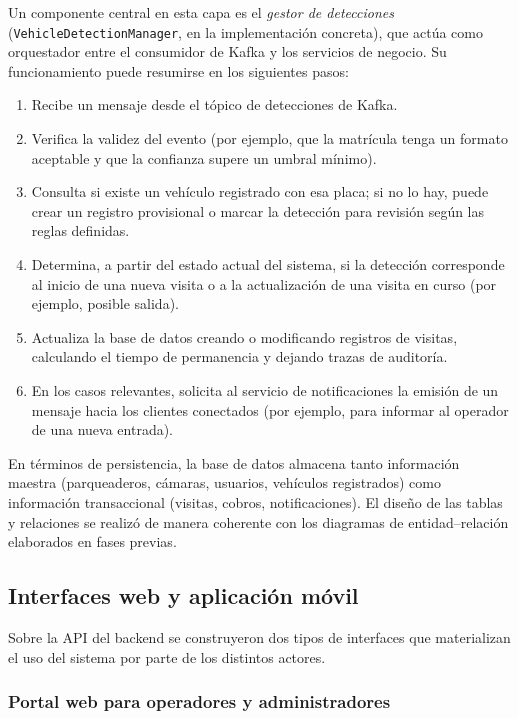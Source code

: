 Un componente central en esta capa es el \textit{gestor de detecciones} (\texttt{VehicleDetectionManager}, en la implementación concreta), que actúa como orquestador entre el consumidor de Kafka y los servicios de negocio. Su funcionamiento puede resumirse en los siguientes pasos:

\begin{enumerate}
    \item Recibe un mensaje desde el tópico de detecciones de Kafka.
    \item Verifica la validez del evento (por ejemplo, que la matrícula tenga un formato aceptable y que la confianza supere un umbral mínimo).
    \item Consulta si existe un vehículo registrado con esa placa; si no lo hay, puede crear un registro provisional o marcar la detección para revisión según las reglas definidas.
    \item Determina, a partir del estado actual del sistema, si la detección corresponde al inicio de una nueva visita o a la actualización de una visita en curso (por ejemplo, posible salida).
    \item Actualiza la base de datos creando o modificando registros de visitas, calculando el tiempo de permanencia y dejando trazas de auditoría.
    \item En los casos relevantes, solicita al servicio de notificaciones la emisión de un mensaje hacia los clientes conectados (por ejemplo, para informar al operador de una nueva entrada).
\end{enumerate}

En términos de persistencia, la base de datos almacena tanto información maestra (parqueaderos, cámaras, usuarios, vehículos registrados) como información transaccional (visitas, cobros, notificaciones). El diseño de las tablas y relaciones se realizó de manera coherente con los diagramas de entidad–relación elaborados en fases previas.

\subsection{Interfaces web y aplicación móvil}

Sobre la API del backend se construyeron dos tipos de interfaces que materializan el uso del sistema por parte de los distintos actores.

\subsubsection{Portal web para operadores y administradores}

